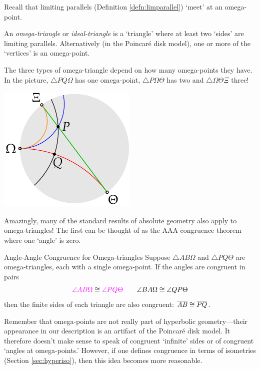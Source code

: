\begin{minipage}[t]{0.7\linewidth}\vspace{-5pt}
	Recall that limiting parallels (Definition \ref{defn:limparallel}) `meet' at an omega-point.
	
	\begin{defn}{}{}
		An \emph{omega-triangle} or \emph{ideal-triangle} is a `triangle' where at least two `sides' are limiting parallels. Alternatively (in the Poincaré disk model), one or more of the `vertices' is an omega-point.
	\end{defn}
	
	The three types of omega-triangle depend on how many omega-points they have. In the picture, $\triangle PQ\Omega$ has one omega-point, $\triangle P\Omega\Theta$ has two and $\triangle \Omega\Theta\Xi$ three!
\end{minipage}
\hfill
\begin{minipage}[t]{0.28\linewidth}\vspace{-5pt}
	\flushright\includegraphics{omega-example}
\end{minipage}\smallbreak
Amazingly, many of the standard results of absolute geometry also apply to omega-triangles! The first can be thought of as the AAA congruence theorem where one `angle' is zero.

\begin{thm}{Angle-Angle Congruence for Omega-triangles}{}
	Suppose $\triangle AB\Omega$ and $\triangle PQ\Theta$ are omega-triangles, each with a single omega-point. If the angles are congruent in pairs
	\[
		\textcolor{Magenta}{\angle AB\Omega} \cong \textcolor{Magenta}{\angle PQ\Theta} \qquad \angle BA\Omega \cong\angle QP\Theta
	\]
	then the finite sides of each triangle are also congruent: $\overline{AB}\cong\overline{PQ}$.
\end{thm}

Remember that omega-points are not really part of hyperbolic geometry---their appearance in our description is an artifact of the Poincaré disk model. It therefore doesn't make sense to speak of congruent `infinite' sides or of congruent `angles at omega-points.' However, if one defines congruence in terms of isometries (Section \ref{sec:hyperiso}), then this idea becomes more reasonable. 

